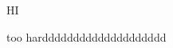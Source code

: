 \documentclass[a4 paper,12pt]{article}
\begin{document}
HI    

too hardddddddddddddddddddd
\end{document}
